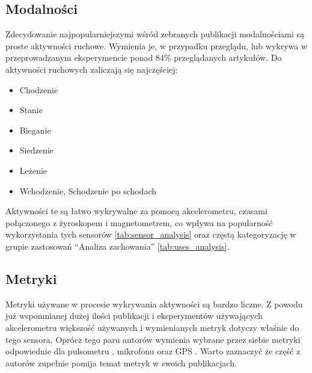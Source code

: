 \subsection{Modalności}
Zdecydowanie najpopularniejszymi wśród zebranych publikacji modalnościami są proste aktywności ruchowe. Wymienia je, w przypadku przeglądu, lub wykrywa w przeprowadzanym eksperymencie ponad 84\% przeglądanych artykułów. Do aktywności ruchowych zaliczają się najczęściej:
\begin{itemize}
    \item Chodzenie
    \item Stanie
    \item Bieganie
    \item Siedzenie
    \item Leżenie
    \item Wchodzenie, Schodzenie po schodach
    \label{base_modalities}
\end{itemize}

Aktywności te są łatwo wykrywalne za pomocą akcelerometru, czasami połączonego z żyroskopem i magnetometrem, co wpływa na popularność wykorzystania tych sensorów \ref{tab:sensor_analysis} oraz częstą kategoryzację w grupie zastosowań ``Analiza zachowania'' \ref{tab:uses_analysis}. 


\subsection{Metryki}
Metryki używane w procesie wykrywania aktywności są bardzo liczne. Z powodu już wspomnianej dużej ilości publikacji i eksperymentów używających akcelerometru większość używanych i wymienianych metryk dotyczy właśnie do tego sensora. Oprócz tego paru autorów wymienia wybrane przez siebie metryki odpowiednie dla pulsometru \cite{4_HAR_Features}, mikrofonu \cite{22_HAR_Survey_Ultrasonic, 46_Indor_Audio_Rec} oraz GPS \cite{26_Mobility_Sensing}. Warto zaznaczyć że część z autorów zupełnie pomija temat metryk w swoich publikacjach.

